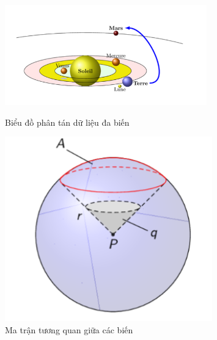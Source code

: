 \begin{figure}[h]
    \centering
    \begin{minipage}{0.45\textwidth}
        \centering
        \includegraphics[width=\textwidth]{../../assets/images/figure-2.png}
        \caption{Biểu đồ phân tán dữ liệu đa biến}
        \label{fig:scatter_multivariate}
    \end{minipage}
    \hfill
    \begin{minipage}{0.45\textwidth}
        \centering
        \includegraphics[width=0.8\textwidth]{../../assets/images/figure-3.png}
        \caption{Ma trận tương quan giữa các biến}
        \label{fig:correlation_matrix}
    \end{minipage}
\end{figure}


